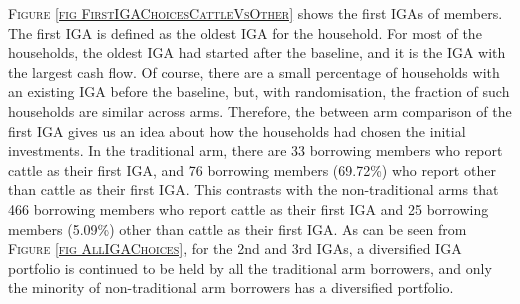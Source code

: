 	\textsc{\footnotesize Figure \ref{fig FirstIGAChoicesCattleVsOther}} shows the first IGAs of members. The first IGA is defined as the oldest IGA for the household. For most of the households, the oldest IGA had started after the baseline, and it is the IGA with the largest cash flow. Of course, there are a small percentage of households with an existing IGA before the baseline, but, with randomisation, the fraction of such households are similar across arms. Therefore, the between arm comparison of the first IGA gives us an idea about how the households had chosen the initial investments. In the \textsf{traditional} arm, there are 33 borrowing members who report cattle as their first IGA, and 76 borrowing members (69.72\%) who report other than cattle as their first IGA. This contrasts with the non-\textsf{traditional} arms that 466 borrowing members who report cattle as their first IGA and 25 borrowing members (5.09\%) other than cattle as their first IGA. As can be seen from \textsc{\small Figure \ref{fig AllIGAChoices}}, for the 2nd and 3rd IGAs, a diversified IGA portfolio is continued to be held by all the \textsf{traditional} arm borrowers, and only the minority of non-\textsf{traditional} arm borrowers has a diversified portfolio.

	
